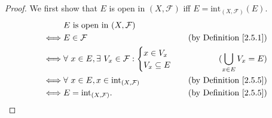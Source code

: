\begin{proof}
    We first show that \(E\) is open in \((X, \mathcal{F})\) iff \(E = \text{int}_{(X, \mathcal{F})}(E)\).
    \begin{align*}
             & E \text{ is open in } (X, \mathcal{F})                                                                           \\
        \iff & E \in \mathcal{F}                                                           & \text{(by Definition \ref{2.5.1})} \\
        \iff & \forall\ x \in E, \exists\ V_x \in \mathcal{F} : \begin{cases}
            x \in V_x \\
            V_x \subseteq E
        \end{cases} & (\bigcup_{x \in E} V_x = E)        \\
        \iff & \forall\ x \in E, x \in \text{int}_{(X, \mathcal{F})}                       & \text{(by Definition \ref{2.5.5})} \\
        \iff & E = \text{int}_{(X, \mathcal{F})}.                                          & \text{(by Definition \ref{2.5.5})}
    \end{align*}


\end{proof}
